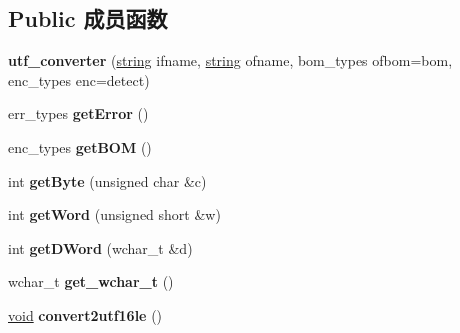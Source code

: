 \subsection*{Public 成员函数}
\begin{DoxyCompactItemize}
\item 
\mbox{\label{classutf__converter_a2fa77e006e0d8ed2ed87fd87e1a4082e}} 
{\bfseries utf\+\_\+converter} (\hyperlink{structstring}{string} ifname, \hyperlink{structstring}{string} ofname, bom\+\_\+types ofbom=bom, enc\+\_\+types enc=detect)
\item 
\mbox{\label{classutf__converter_a85e4df7465bace73900bda4b6c370b4b}} 
err\+\_\+types {\bfseries get\+Error} ()
\item 
\mbox{\label{classutf__converter_ae4b82ecb11ae7e239d63ff749f5cb9b7}} 
enc\+\_\+types {\bfseries get\+B\+OM} ()
\item 
\mbox{\label{classutf__converter_a17146b0b071723d75da98dc375c3b77e}} 
int {\bfseries get\+Byte} (unsigned char \&c)
\item 
\mbox{\label{classutf__converter_a28b6616ef5820e942161e1fa87121485}} 
int {\bfseries get\+Word} (unsigned short \&w)
\item 
\mbox{\label{classutf__converter_aed6b5b8d767ba4a390d3affa27ddd635}} 
int {\bfseries get\+D\+Word} (wchar\+\_\+t \&d)
\item 
\mbox{\label{classutf__converter_a15ca3e7629d6475f25abcb4b9646c037}} 
wchar\+\_\+t {\bfseries get\+\_\+wchar\+\_\+t} ()
\item 
\mbox{\label{classutf__converter_a97981bcd421302543bacf53ed0e3e112}} 
\hyperlink{interfacevoid}{void} {\bfseries convert2utf16le} ()
\end{DoxyCompactItemize}
